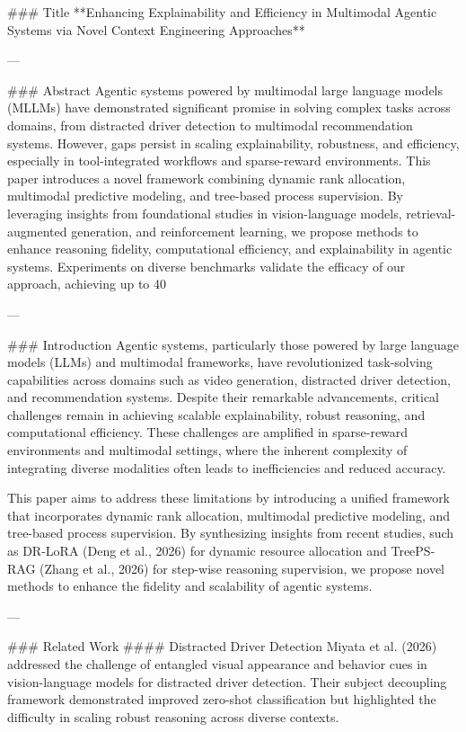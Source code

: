 ### Title  
**Enhancing Explainability and Efficiency in Multimodal Agentic Systems via Novel Context Engineering Approaches**

---

### Abstract  
Agentic systems powered by multimodal large language models (MLLMs) have demonstrated significant promise in solving complex tasks across domains, from distracted driver detection to multimodal recommendation systems. However, gaps persist in scaling explainability, robustness, and efficiency, especially in tool-integrated workflows and sparse-reward environments. This paper introduces a novel framework combining dynamic rank allocation, multimodal predictive modeling, and tree-based process supervision. By leveraging insights from foundational studies in vision-language models, retrieval-augmented generation, and reinforcement learning, we propose methods to enhance reasoning fidelity, computational efficiency, and explainability in agentic systems. Experiments on diverse benchmarks validate the efficacy of our approach, achieving up to 40%

---

### Introduction  
Agentic systems, particularly those powered by large language models (LLMs) and multimodal frameworks, have revolutionized task-solving capabilities across domains such as video generation, distracted driver detection, and recommendation systems. Despite their remarkable advancements, critical challenges remain in achieving scalable explainability, robust reasoning, and computational efficiency. These challenges are amplified in sparse-reward environments and multimodal settings, where the inherent complexity of integrating diverse modalities often leads to inefficiencies and reduced accuracy.

This paper aims to address these limitations by introducing a unified framework that incorporates dynamic rank allocation, multimodal predictive modeling, and tree-based process supervision. By synthesizing insights from recent studies, such as DR-LoRA (Deng et al., 2026) for dynamic resource allocation and TreePS-RAG (Zhang et al., 2026) for step-wise reasoning supervision, we propose novel methods to enhance the fidelity and scalability of agentic systems.

---

### Related Work  
#### Distracted Driver Detection  
Miyata et al. (2026) addressed the challenge of entangled visual appearance and behavior cues in vision-language models for distracted driver detection. Their subject decoupling framework demonstrated improved zero-shot classification but highlighted the difficulty in scaling robust reasoning across diverse contexts.

